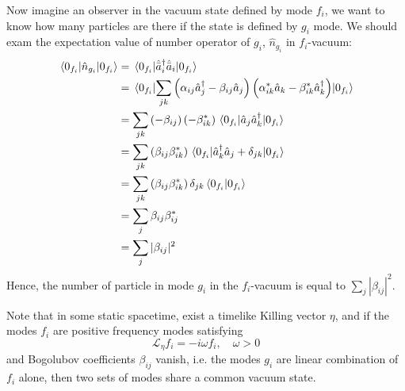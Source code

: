 \documentclass[12pt]{article}
\numberwithin{equation}{section}
\theoremstyle{1style}
\begin{document}
Now imagine an observer in the vacuum state defined by mode \(f_i\), we want to know how many particles are there if the state is defined by \(g_i\) mode.
We should exam the expectation value of number operator of \(g_i\), \(\hat{n}_{g_i}\) in \(f_i\)-vacuum:
\begin{align}
  \expval{\hat{n}_{g_i}}{0_{f_i}} & =\expval{\hat{\bar{a}}_i^\dagger \hat{\bar{a}}_i}{0_{f_i}}                                                                                                     \\
                                  & =\expval{\sum_{jk}\left(\alpha_{ij}\hat{a}^{\dagger}_j-\beta_{ij}\hat{a}_j\right)\left(\alpha^*_{ik}\hat{a}_k-\beta^*_{ik}\hat{a}^{\dagger}_k\right)}{0_{f_i}} \\
                                  & =\sum_{jk}\left(-\beta_{ij}\right)\left(-\beta^*_{ik}\right)\expval{\hat{a}_j\hat{a}^{\dagger}_k}{0_{f_i}}                                                     \\
                                  & =\sum_{jk}\left(\beta_{ij}\beta^*_{ik}\right)\expval{\hat{a}^{\dagger}_k\hat{a}_j+\delta_{jk}}{0_{f_i}}                                                        \\
                                  & =\sum_{jk}\left(\beta_{ij}\beta^*_{ik}\right)\delta_{jk}\braket{0_{f_i}}{0_{f_i}}                                                                              \\
                                  & =\sum_{j}\beta_{ij}\beta^*_{ij}                                                                                                                                \\
                                  & =\sum_{j}|\beta_{ij}|^2
\end{align}
Hence, the number of particle in mode \(g_i\) in the \(f_i\)-vacuum is equal to \(\sum_{j}|\beta_{ij}|^2\).

Note that in some static spacetime, exist a timelike Killing vector \(\eta\), and if the modes \(f_i\) are positive frequency
modes satisfying
\begin{equation}
  \mathcal{L}_{\eta}f_i=-i\omega f_i,\quad \omega>0
\end{equation}
and Bogolubov coefficients \(\beta_{ij}\) vanish, i.e. the modes \(g_i\) are linear combination of \(f_i\) alone,
then two sets of modes share a common vacuum state.
\end{document}
